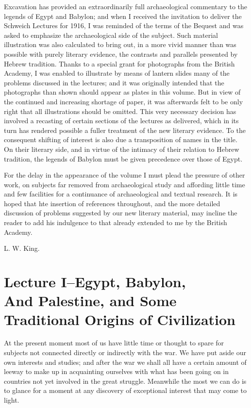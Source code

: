 \documentclass[12pt,oneside]{book}
\begin{document}
Excavation has provided an extraordinarily full archaeological commentary to the legends of Egypt and Babylon; and when I received the invitation to deliver the Schweich Lectures for 1916, I was reminded of the terms of the Bequest and was asked to emphasize the archaeological side of the subject. Such material illustration was also calculated to bring out, in a more vivid manner than was possible with purely literary evidence, the contrasts and parallels presented by Hebrew tradition. Thanks to a special grant for photographs from the British Academy, I was enabled to illustrate by means of lantern slides many of the problems discussed in the lectures; and it was originally intended that the photographs than shown should appear as plates in this volume. But in view of the continued and increasing shortage of paper, it was afterwards felt to be only right that all illustrations should be omitted. This very necessary decision has involved a recasting of certain sections of the lectures as delivered, which in its turn has rendered possible a fuller treatment of the new literary evidence. To the consequent shifting of interest is also due a transposition of names in the title. On their literary side, and in virtue of the intimacy of their relation to Hebrew tradition, the legends of Babylon must be given precedence over those of Egypt. \par 

For the delay in the appearance of the volume I must plead the pressure of other work, on subjects far removed from archaeological study and affording little time and few facilities for a continuance of archaeological and textual research. It is hoped that hte insertion of references throughout, and the more detailed discussion of problems suggested by our new literary material, may incline the reader to add his indulgence to that already extended to me by the British Academy. \par 

L. W. King. 

\mainmatter

\chapter[Lecture I - Origins of Civilization]{Lecture I--Egypt, Babylon,\\ And Palestine, and Some \\Traditional Origins of Civilization}
At the present moment most of us have little time or thought to spare for subjects not connected directly or indirectly with the war. We have put aside our own interests and studies; and after the war we shall all have a certain amount of leeway to make up in acquainting ourselves with what has been going on in countries not yet involved in the great struggle. Meanwhile the most we can do is to glance for a moment at any discovery of exceptional interest that may come to light. \par 
\end{document}
